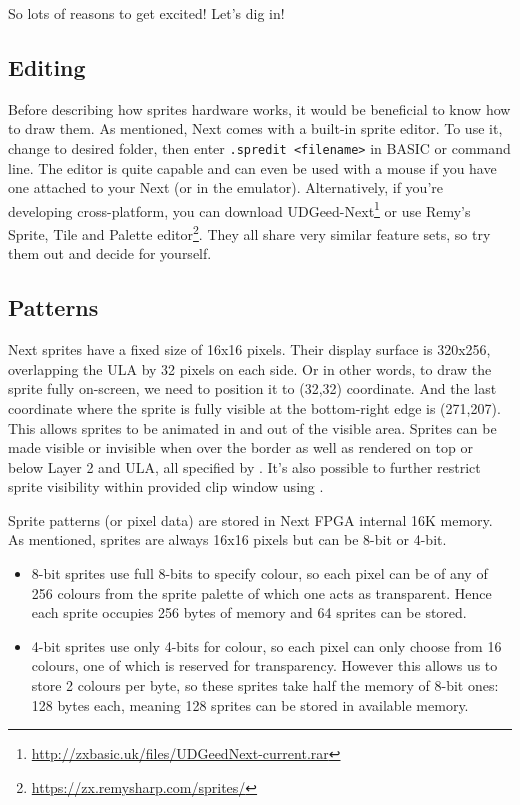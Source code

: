 So lots of reasons to get excited! Let's dig in!

\subsection{Editing}

Before describing how sprites hardware works, it would be beneficial to know how to draw them. As mentioned, Next comes with a built-in sprite editor. To use it, change to desired folder, then enter {\tt .spredit <filename>} in BASIC or command line. The editor is quite capable and can even be used with a mouse if you have one attached to your Next (or in the emulator). Alternatively, if you're developing cross-platform, you can download UDGeed-Next\footnote{\url{http://zxbasic.uk/files/UDGeedNext-current.rar}} or use Remy's Sprite, Tile and Palette editor\footnote{\url{https://zx.remysharp.com/sprites/}}. They all share very similar feature sets, so try them out and decide for yourself.


\subsection{Patterns}

Next sprites have a fixed size of 16x16 pixels. Their display surface is 320x256, overlapping the ULA by 32 pixels on each side. Or in other words, to draw the sprite fully on-screen, we need to position it to (32,32) coordinate. And the last coordinate where the sprite is fully visible at the bottom-right edge is (271,207). This allows sprites to be animated in and out of the visible area. Sprites can be made visible or invisible when over the border as well as rendered on top or below Layer 2 and ULA, all specified by . It's also possible to further restrict sprite visibility within provided clip window using .

Sprite patterns (or pixel data) are stored in Next FPGA internal 16K memory. As mentioned, sprites are always 16x16 pixels but can be 8-bit or 4-bit.

\begin{itemize}[topsep=1pt,itemsep=1pt]
	\item 8-bit sprites use full 8-bits to specify colour, so each pixel can be of any of 256 colours from the sprite palette of which one acts as transparent. Hence each sprite occupies 256 bytes of memory and 64 sprites can be stored.

	\item 4-bit sprites use only 4-bits for colour, so each pixel can only choose from 16 colours, one of which is reserved for transparency. However this allows us to store 2 colours per byte, so these sprites take half the memory of 8-bit ones: 128 bytes each, meaning 128 sprites can be stored in available memory.
\end{itemize}


